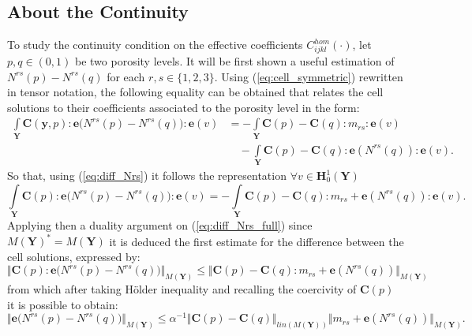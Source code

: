 \subsection{About the Continuity}

To study the continuity condition on the effective coefficients $C^{hom}_{ijkl}(\cdot)$, let $p, q \in (0,1)$ be two porosity levels. It will be first shown a useful estimation of $N^{rs}(p)-N^{rs}(q)$ for each $r,s \in \{1,2,3\}$. 
Using (\ref{eq:cell_symmetric}) rewritten in tensor notation, the following equality can be obtained that relates the cell solutions to their coefficients associated to the porosity level in the form:
\begin{equation}
    \label{eq:diff_Nrs}
    \begin{aligned}
        \int\limits_{\mathbf{Y}} \mathbf{C}(\mathbf{y},p):\mathbf{e}\big( N^{rs}(p)-N^{rs}(q) \big) : \mathbf{e}(v) & =  -\int\limits_{\mathbf{Y}} \mathbf{C}(p)-\mathbf{C}(q) : m_{rs}:\mathbf{e}(v) \\
        & \quad - \int\limits_{\mathbf{Y}}\mathbf{C}(p)-\mathbf{C}(q):\mathbf{e}(N^{rs}(q)):\mathbf{e}(v).
    \end{aligned}
\end{equation}
So that, using (\ref{eq:diff_Nrs}) it follows the representation $\forall v \in \mathbf{H}^1_{0}(\mathbf{Y})$
\begin{equation}
    \label{eq:diff_Nrs_full}
    \int\limits_{\mathbf{Y}} \mathbf{C}(p):\mathbf{e}\big(N^{rs}(p)-N^{rs}(q)\big):\mathbf{e}(v) = -\int\limits_{\mathbf{Y}} \mathbf{C}(p)-\mathbf{C}(q):m_{rs}+\mathbf{e}(N^{rs}(q)):\mathbf{e}(v).
\end{equation}
Applying then a duality argument on (\ref{eq:diff_Nrs_full}) since $M(\mathbf{Y})^* = M(\mathbf{Y})$ it is deduced the first estimate for the difference between the cell solutions, expressed by:
\begin{equation*}
    \Vert \mathbf{C}(p):\mathbf{e}\big(N^{rs}(p)-N^{rs}(q)\big) \Vert_{M(\mathbf{Y})} \leq \Vert \mathbf{C}(p)-\mathbf{C}(q):m_{rs}+\mathbf{e}(N^{rs}(q))\Vert_{M(\mathbf{Y})}
\end{equation*}
from which after taking H\"{o}lder inequality and recalling the coercivity of $\mathbf{C}(p)$ it is possible to obtain:
\begin{equation}
    \label{eq:ineq_diff_N}
    \Vert \mathbf{e}\big(N^{rs}(p)-N^{rs}(q)\big) \Vert_{M(\mathbf{Y})} \leq \alpha^{-1}\Vert \mathbf{C}(p)-\mathbf{C}(q) \Vert_{lin (M(\mathbf{Y}))} \Vert m_{rs}+\mathbf{e}(N^{rs}(q)) \Vert_{M(\mathbf{Y})}.
\end{equation}

